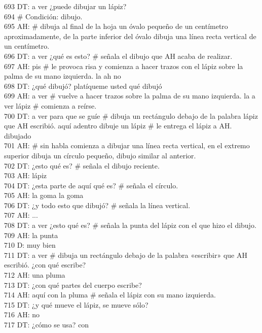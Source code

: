 693 DT: a ver ¿puede dibujar un lápiz?\\
694 \# Condición: dibujo.\\
695 AH: \# dibuja al final de la hoja un óvalo pequeño de un centímetro aproximadamente, de la parte inferior del óvalo dibuja una línea recta vertical de un centímetro.\\
696 DT: a ver ¿qué es esto? \# señala el dibujo que AH acaba de realizar.\\
697 AH: pis \# le provoca risa y comienza a hacer trazos con el lápiz sobre la palma de su mano izquierda. la ah no\\
698 DT: ¿qué dibujó? platíqueme usted qué dibujó\\
699 AH: a ver \# vuelve a hacer trazos sobre la palma de su mano izquierda. la a ver lápiz \# comienza a reírse. \\
700 DT: a ver para que se guíe \# dibuja un rectángulo debajo de la palabra lápiz que AH escribió. aquí adentro dibuje un lápiz \# le entrega el lápiz a AH. dibujado\\
701 AH: \# sin habla comienza a dibujar una línea recta vertical, en el extremo superior dibuja un círculo pequeño, dibujo similar al anterior.\\
702 DT: ¿esto qué es? \# señala el dibujo reciente.\\
703 AH: lápiz\\
704 DT: ¿esta parte de aquí qué es? \# señala el círculo.\\
705 AH: la goma la goma\\
706 DT: ¿y todo esto que dibujó? \# señala la línea vertical.\\
707 AH: ...\\
708 DT: a ver ¿esto qué es? \# señala la punta del lápiz con el que hizo el dibujo.\\
709 AH: la punta\\
710 D: muy bien\\
711 DT: a ver \# dibuja un rectángulo debajo de la palabra «escribir» que AH escribió. ¿con qué escribe?\\
712 AH: una pluma\\
713 DT: ¿con qué partes del cuerpo escribe?\\
714 AH: aquí con la pluma \# señala el lápiz con su mano izquierda.\\
715 DT: ¿y qué mueve el lápiz, se mueve sólo?\\
716 AH: no\\
717 DT: ¿cómo se usa? con\\
